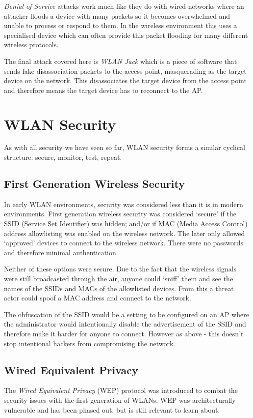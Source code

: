\textit{Denial of Service} attacks work much like they do with wired networks where an attacker floods a device with many packets so it becomes overwhelmed and unable to process or respond to them. In the wireless environment this uses a specialised device which can often provide this packet flooding for many different wireless protocols. 

The final attack covered here is \textit{WLAN Jack} which is a piece of software that sends fake disassociation packets to the access point, masquerading as the target device on the network. This disassociates the target device from the access point and therefore means the target device has to reconnect to the AP. 

\section{WLAN Security}
As with all security we have seen so far, WLAN security forms a similar cyclical structure: secure, monitor, test, repeat.

\subsection{First Generation Wireless Security}
In early WLAN environments, security was considered less than it is in modern environments. First generation wireless security was considered `secure' if the SSID (Service Set Identifier) was hidden; and/or if MAC (Media Access Control) address allowlisting was enabled on the wireless network. The later only allowed `approved' devices to connect to the wireless network. There were no passwords and therefore minimal authentication.

Neither of these options were secure. Due to the fact that the wireless signals were still broadcasted through the air, anyone could `sniff' them and see the names of the SSIDs and MACs of the allowlisted devices. From this a threat actor could spoof a MAC address and connect to the network.

The obfuscation of the SSID would be a setting to be configured on an AP where the administrator would intentionally disable the advertisement of the SSID and therefore make it harder for anyone to connect. However as above - this doesn't stop intentional hackers from compromising the network. 

\subsection{Wired Equivalent Privacy}
The \textit{Wired Equivalent Privacy} (WEP) protocol was introduced to combat the security issues with the first generation of WLANs. WEP was architecturally vulnerable and has been phased out, but is still relevant to learn about.


